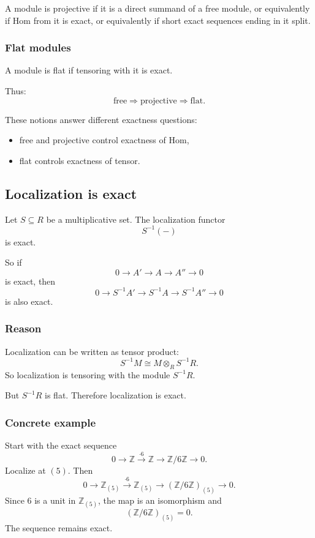 \documentclass[12pt,a4paper]{article}
\theoremstyle{notespace}
\theoremstyle{definition}
\begin{document}
A module is projective if it is a direct summand of a free module, or equivalently if Hom from it is exact, or equivalently if short exact sequences ending in it split.

\subsubsection*{Flat modules}

A module is flat if tensoring with it is exact.

Thus:
\[
\text{free} \Longrightarrow \text{projective} \Longrightarrow \text{flat}.
\]

These notions answer different exactness questions:
\begin{itemize}
	\item free and projective control exactness of Hom,
	\item flat controls exactness of tensor.
\end{itemize}

\subsection{ Localization is exact}

Let \(S\subseteq R\) be a multiplicative set.
The localization functor
\[
S^{-1}(-)
\]
is exact.

So if
\[
0 \longrightarrow A' \longrightarrow A \longrightarrow A'' \longrightarrow 0
\]
is exact, then
\[
0 \longrightarrow S^{-1}A' \longrightarrow S^{-1}A \longrightarrow S^{-1}A'' \longrightarrow 0
\]
is also exact.

\subsubsection*{Reason}

Localization can be written as tensor product:
\[
S^{-1}M \cong M\otimes_R S^{-1}R.
\]
So localization is tensoring with the module \(S^{-1}R\).

But \(S^{-1}R\) is flat.
Therefore localization is exact.

\subsubsection*{Concrete example}

Start with the exact sequence
\[
0 \longrightarrow \mathbb Z \xrightarrow{\cdot 6} \mathbb Z \longrightarrow \mathbb Z/6\mathbb Z \longrightarrow 0.
\]
Localize at \((5)\). Then
\[
0 \longrightarrow \mathbb Z_{(5)} \xrightarrow{\cdot 6} \mathbb Z_{(5)}
\longrightarrow (\mathbb Z/6\mathbb Z)_{(5)} \longrightarrow 0.
\]
Since \(6\) is a unit in \(\mathbb Z_{(5)}\), the map is an isomorphism and
\[
(\mathbb Z/6\mathbb Z)_{(5)}=0.
\]
The sequence remains exact.
\end{document}
